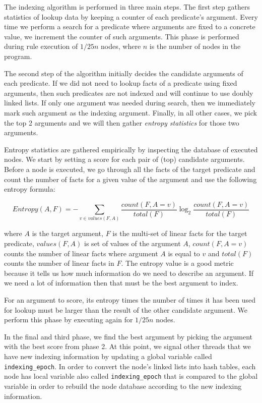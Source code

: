 The indexing algorithm is performed in three main steps. The first step gathers statistics of lookup data by keeping a counter
of each predicate's argument.
Every time we perform a search for a predicate where arguments are fixed to a concrete value, we increment the counter of such arguments. This phase is performed during rule execution of $1/25n$ nodes, where $n$ is the number of nodes in the program.

The second step of the algorithm initially decides the candidate arguments of each predicate. If we did not need to lookup
facts of a predicate using fixed arguments, then such predicates are not indexed and will continue to use doubly linked lists.
If only one argument was needed during search, then we immediately mark such argument as the indexing argument. Finally, in all
other cases, we pick the top 2 arguments and we will then gather \emph{entropy statistics} for those two arguments.

Entropy statistics are gathered empirically by inspecting the database of executed nodes. We start by setting a score
for each pair of (top) candidate arguments. Before a node is executed, we go through all the facts of the target predicate
and count the number of facts for a given value of the argument and use the following entropy formula:

\[
Entropy(A, F) = - \sum_{v \in values(F, A)} \frac{count(F, A = v)}{total(F)} 	\log_2 \frac{count(F, A = v)}{total(F)}
\]

where $A$ is the target argument, $F$ is the multi-set of linear facts for the target predicate, $values(F, A)$ is set of values of the argument $A$, $count(F, A = v)$ counts the number
of linear facts where argument $A$ is equal to $v$ and $total(F)$ counts the number of linear facts in $F$.
The entropy value is a good metric because it tells us how much information do we need to describe an argument. If we
need a lot of information then that must be the best argument to index.

For an argument to score, its entropy times the number of times it has been used for lookup must be larger than the result of the other
candidate argument. We perform this phase by executing again for $1/25n$ nodes.

In the final and third phase, we find the best argument by picking the argument with the best score from phase 2. At this point,
we signal other threads that we have new indexing information by updating a global variable called \texttt{indexing\_epoch}.
In order to convert the node's linked lists into hash tables, each node has local variable also called \texttt{indexing\_epoch}
that is compared to the global variable in order to rebuild the node database according to the new indexing
information.

